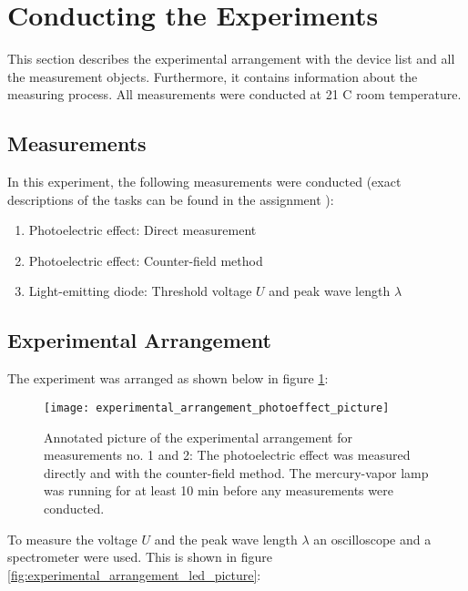 \section{Conducting the Experiments}
\label{sec:Conducting_the_Experiments}
This section describes the experimental arrangement with the device list and all the measurement objects. Furthermore, it contains information about the measuring process. All measurements were conducted at 21 \textdegree C room temperature.

\subsection{Measurements}
\label{subsec:Measurements}
In this experiment, the following measurements were conducted (exact descriptions of the tasks can be found in the assignment \cite{light_quantum}):

\begin{enumerate}
	\item Photoelectric effect: Direct measurement
	\item Photoelectric effect: Counter-field method
	\item Light-emitting diode: Threshold voltage $U$ and peak wave length $\lambda$
\end{enumerate}

\subsection{Experimental Arrangement}
\label{subsec:experimental_arrangement}
The experiment was arranged as shown below in figure \ref{fig:experimental_arrangement}:
\begin{figure}[H]
	\centering
	\texttt{[image: experimental\_arrangement\_photoeffect\_picture]}
	\caption{Annotated picture of the experimental arrangement for measurements no. 1 and 2: The photoelectric effect was measured directly and with the counter-field method. The mercury-vapor lamp was running for at least 10 min before any measurements were conducted.}
	\label{fig:experimental_arrangement}
\end{figure}

\newpage
To measure the voltage $U$ and the peak wave length $\lambda$ an oscilloscope and a spectrometer were used. This is shown in figure \ref{fig:experimental_arrangement_led_picture}:

